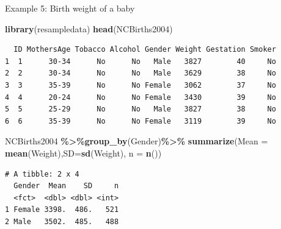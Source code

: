 \documentclass[
  ignorenonframetext,
]{beamer}
\newenvironment{Shaded}{\begin{snugshade}}{\end{snugshade}}
\newcommand{\AttributeTok}[1]{\textcolor[rgb]{0.13,0.29,0.53}{#1}}
\newcommand{\FunctionTok}[1]{\textcolor[rgb]{0.13,0.29,0.53}{\textbf{#1}}}
\newcommand{\NormalTok}[1]{#1}
\newcommand{\SpecialCharTok}[1]{\textcolor[rgb]{0.81,0.36,0.00}{\textbf{#1}}}
\begin{document}
\begin{frame}[fragile]{Example 5: Birth weight of a baby}
\protect\hypertarget{example-5-birth-weight-of-a-baby-1}{}
\tiny

\begin{Shaded}
\begin{Highlighting}[]
\FunctionTok{library}\NormalTok{(resampledata)}
\FunctionTok{head}\NormalTok{(NCBirths2004)}
\end{Highlighting}
\end{Shaded}

\begin{verbatim}
  ID MothersAge Tobacco Alcohol Gender Weight Gestation Smoker
1  1      30-34      No      No   Male   3827        40     No
2  2      30-34      No      No   Male   3629        38     No
3  3      35-39      No      No Female   3062        37     No
4  4      20-24      No      No Female   3430        39     No
5  5      25-29      No      No   Male   3827        38     No
6  6      35-39      No      No Female   3119        39     No
\end{verbatim}

\begin{Shaded}
\begin{Highlighting}[]
\NormalTok{NCBirths2004 }\SpecialCharTok{\%\textgreater{}\%}\FunctionTok{group\_by}\NormalTok{(Gender)}\SpecialCharTok{\%\textgreater{}\%} 
  \FunctionTok{summarize}\NormalTok{(}\AttributeTok{Mean =} \FunctionTok{mean}\NormalTok{(Weight),}\AttributeTok{SD=}\FunctionTok{sd}\NormalTok{(Weight), }\AttributeTok{n =} \FunctionTok{n}\NormalTok{())}
\end{Highlighting}
\end{Shaded}

\begin{verbatim}
# A tibble: 2 x 4
  Gender  Mean    SD     n
  <fct>  <dbl> <dbl> <int>
1 Female 3398.  486.   521
2 Male   3502.  485.   488
\end{verbatim}

\normalsize
\end{frame}
\end{document}
